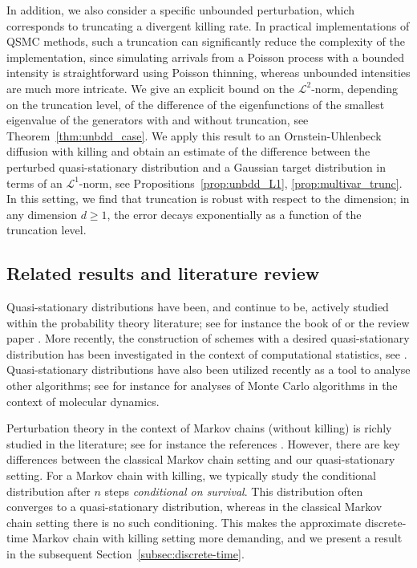 \documentclass{aptpub}
\begin{document}
In addition, we also consider a specific unbounded perturbation, which corresponds to truncating a divergent killing rate.
In practical implementations of QSMC methods, such a truncation can significantly reduce the complexity of the implementation, since simulating arrivals from a Poisson process with a bounded intensity is straightforward using Poisson thinning, whereas unbounded intensities are much more intricate. 
We give an explicit bound on the $\mathcal{L}^2$-norm, depending on the truncation level, of the difference of the eigenfunctions of the smallest eigenvalue of the generators with and without truncation, see Theorem~\ref{thm:unbdd_case}. We apply this result to an Ornstein-Uhlenbeck diffusion with killing and obtain an estimate of the difference between the perturbed quasi-stationary distribution and a Gaussian target distribution in terms of an $\mathcal{L}^1$-norm, see Propositions~\ref{prop:unbdd_L1}, \ref{prop:multivar_trunc}. In this setting, we find that truncation is robust with respect to the dimension; in any dimension $d\ge 1$, the error decays exponentially as a function of the truncation level.







\subsection{Related results and literature review}

Quasi-stationary distributions have been, and continue to be, actively studied within the probability theory literature; see for instance the book of \cite{Collet2013} or the review paper \cite{Meleard2012}. More recently, the construction of schemes with a desired quasi-stationary distribution has been investigated in the context of computational statistics, see \cite{Pollock2020, Kumar2019, Wang2019TheoQSMC}. Quasi-stationary distributions have also been utilized recently as a tool to analyse other algorithms; see for instance \cite{Lelievre2015, Baudel2020} for analyses of Monte Carlo algorithms in the context of molecular dynamics. 

Perturbation theory in the context of Markov chains (without killing) is richly studied in the literature; see for instance the references \cite{kartashov2019strong,roberts1998convergence,mitrophanov2003stability, mitrophanov_2005,johndrow2017error, rudolf2018,Medina-Aguayo2018,hosseini2018convergence, Negrea2021,fuhrmann2021wasserstein}. 
However, there are key differences between the classical Markov chain setting and our quasi-stationary setting. For a Markov chain with killing, we typically study the conditional distribution after $n$ steps \textit{conditional on survival}. This distribution often converges to a quasi-stationary distribution, whereas in the classical Markov chain setting there is no such conditioning. This makes the approximate discrete-time Markov chain with killing setting more demanding, and we present a result in the subsequent Section~\ref{subsec:discrete-time}. 
\end{document}
